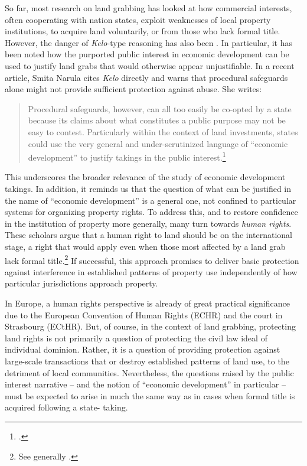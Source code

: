 So far, most research on land grabbing has looked at how commercial interests, often cooperating with nation states, exploit weaknesses of local property institutions, to acquire land voluntarily, or from those who lack formal title. However, the danger of {\it Kelo}-type reasoning has also been . In particular, it has been noted how the purported public interest in economic development can be used to justify land grabs that would otherwise appear unjustifiable. In a recent article, Smita Narula cites {\it Kelo} directly and warns that procedural safeguards alone might not provide sufficient protection against abuse. She writes:
\begin{quote}
Procedural safeguards, however, can all too easily be co-opted by a state because its claims about what constitutes a public purpose may not be easy to contest. Particularly within the context of land investments, states could use the very general and under-scrutinized language of ``economic development'' to justify takings in the public interest.\footcite[157]{narula13}
\end{quote}

This underscores the broader relevance of the study of economic development takings. In addition, it reminds us that the question of what can be justified in the name of ``economic development'' is a general one, not confined to particular systems for organizing property rights. To address this, and to restore confidence in the institution of property more generally, many turn towards {\it human rights}. These scholars argue that a human right to land should be  on the international stage, a right that would apply even when those most affected by a land grab lack formal title.\footnote{See generally \cite{schutter10,schutter11,kunnerman13}.} If successful, this approach promises to deliver basic protection against interference in established patterns of property use independently of how particular jurisdictions approach property.

In Europe, a human rights perspective is already of great practical significance due to the European Convention of Human Rights (ECHR) and the court in Strasbourg (ECtHR). But, of course, in the context of land grabbing, protecting land rights is not primarily a question of protecting the civil law ideal of individual dominion. Rather, it is a question of providing protection against large-scale transactions that  or destroy established patterns of land use, to the detriment of local communities. Nevertheless, the questions raised by the public interest  narrative -- and the notion of ``economic development'' in particular -- must be expected to arise in much the same way as in cases when formal title is acquired following a state- taking.

